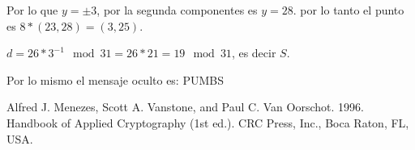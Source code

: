 \documentclass[12pt, fleqn]{report}                             %
\theoremstyle{break}                                            %
\begin{document}
\begin{itemize}
\begin{itemize}
        Por lo que $y = \pm 3$, por la segunda componentes es $y = 28$.
        por lo tanto el punto es $8 * (23, 28) = (3, 25)$.

        $d = 26 * 3^{-1} \mod {31} = 26 * 21 = 19 \mod{31}$, 
        es decir $S$.

        Por lo mismo el mensaje oculto es:
        PUMBS
      \end{itemize}

      

      
      

      

  
  
  \end{itemize}


  \begin{thebibliography}{10}

      Alfred J. Menezes, Scott A. Vanstone, and Paul C. Van Oorschot. 1996. Handbook of Applied
      Cryptography (1st ed.). CRC Press, Inc., Boca Raton, FL, USA.

  \end{thebibliography}
\end{document}
